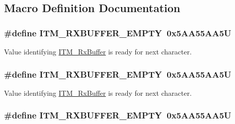 \subsection{Macro Definition Documentation}
\hypertarget{group___c_m_s_i_s__core___debug_functions_gaa822cb398ee022b59e9e6c5d7bbb228a}{
\subsubsection[{I\-T\-M\-\_\-\-R\-X\-B\-U\-F\-F\-E\-R\-\_\-\-E\-M\-P\-T\-Y}]{\setlength{\rightskip}{0pt plus 5cm}\#define I\-T\-M\-\_\-\-R\-X\-B\-U\-F\-F\-E\-R\-\_\-\-E\-M\-P\-T\-Y~0x5\-A\-A55\-A\-A5\-U}}\label{group___c_m_s_i_s__core___debug_functions_gaa822cb398ee022b59e9e6c5d7bbb228a}
Value identifying \hyperlink{group___c_m_s_i_s__core___debug_functions_ga12e68e55a7badc271b948d6c7230b2a8}{I\-T\-M\-\_\-\-Rx\-Buffer} is ready for next character. \hypertarget{group___c_m_s_i_s__core___debug_functions_gaa822cb398ee022b59e9e6c5d7bbb228a}{
\subsubsection[{I\-T\-M\-\_\-\-R\-X\-B\-U\-F\-F\-E\-R\-\_\-\-E\-M\-P\-T\-Y}]{\setlength{\rightskip}{0pt plus 5cm}\#define I\-T\-M\-\_\-\-R\-X\-B\-U\-F\-F\-E\-R\-\_\-\-E\-M\-P\-T\-Y~0x5\-A\-A55\-A\-A5\-U}}\label{group___c_m_s_i_s__core___debug_functions_gaa822cb398ee022b59e9e6c5d7bbb228a}
Value identifying \hyperlink{group___c_m_s_i_s__core___debug_functions_ga12e68e55a7badc271b948d6c7230b2a8}{I\-T\-M\-\_\-\-Rx\-Buffer} is ready for next character. \hypertarget{group___c_m_s_i_s__core___debug_functions_gaa822cb398ee022b59e9e6c5d7bbb228a}{
\subsubsection[{I\-T\-M\-\_\-\-R\-X\-B\-U\-F\-F\-E\-R\-\_\-\-E\-M\-P\-T\-Y}]{\setlength{\rightskip}{0pt plus 5cm}\#define I\-T\-M\-\_\-\-R\-X\-B\-U\-F\-F\-E\-R\-\_\-\-E\-M\-P\-T\-Y~0x5\-A\-A55\-A\-A5\-U}}\label{group___c_m_s_i_s__core___debug_functions_gaa822cb398ee022b59e9e6c5d7bbb228a}
